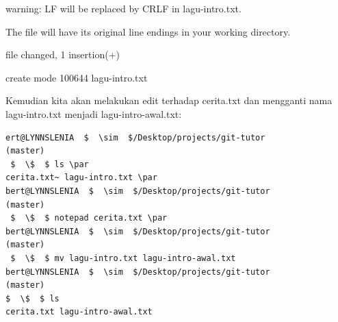 \noindent 
{\fontsize{10pt}{10pt}\selectfont warning: LF will be replaced by CRLF in lagu-intro.txt.} \par
\noindent 
{\fontsize{10pt}{10pt}\selectfont The file will have its original line endings in your working directory.} \par
\noindent 
{\fontsize{10pt}{10pt} file changed, 1 insertion(+)} \par
\noindent 
{\fontsize{10pt}{10pt}\selectfont  create mode 100644 lagu-intro.txt} \par
\vspace{12pt}
\hspace*{0.50in} Kemudian kita akan melakukan edit terhadap cerita.txt dan mengganti nama lagu-intro.txt menjadi lagu-intro-awal.txt: \par
\begin{verbatim}
ert@LYNNSLENIA  $  \sim  $/Desktop/projects/git-tutor 
(master) 
 $  \$  $ ls \par
cerita.txt~ lagu-intro.txt \par
bert@LYNNSLENIA  $  \sim  $/Desktop/projects/git-tutor 
(master) 
 $  \$  $ notepad cerita.txt \par
bert@LYNNSLENIA  $  \sim  $/Desktop/projects/git-tutor 
(master) 
 $  \$  $ mv lagu-intro.txt lagu-intro-awal.txt 
bert@LYNNSLENIA  $  \sim  $/Desktop/projects/git-tutor 
(master) 
$  \$  $ ls 
cerita.txt lagu-intro-awal.txt 
\end{verbatim}

